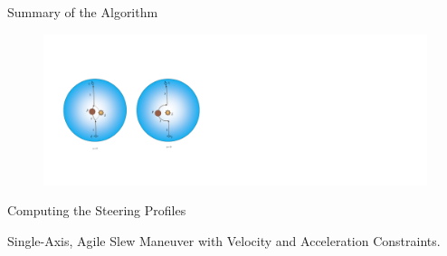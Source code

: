 \documentclass{beamer}
\begin{document}
%
\begin{frame}{Summary of the Algorithm}
\begin{block}{}
\begin{figure}
\includegraphics[width=4.85in]{./Figures/SASSchematic3}
\end{figure}
\end{block}
\end{frame}
%
%
%
\begin{frame}
\begin{block}{}
\begin{center}
{\LARGE{Computing the Steering Profiles}}
\begin{center}
 Single-Axis, Agile Slew Maneuver with Velocity and Acceleration Constraints.
\end{center}
\end{center}
\end{block}
\end{frame}
\end{document}
